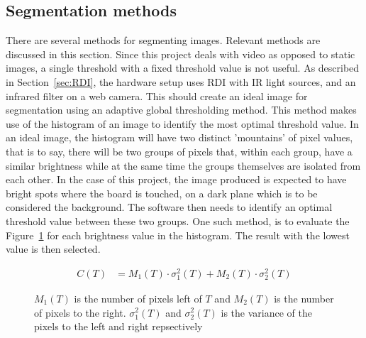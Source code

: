 \subsection{Segmentation methods}
There are several methods for segmenting images. Relevant methods are discussed in this section. Since this project deals with video as opposed to static images, a single threshold with a fixed threshold value is not useful. As described in Section~\ref{sec:RDI}, the hardware setup uses RDI with IR light sources, and an  infrared filter on a web camera. This should create an ideal image for segmentation using an adaptive global thresholding method. This method makes use of the histogram of an image to identify the most optimal threshold value\citep{Moeslund2012c4}. In an ideal image, the histogram will have two distinct 'mountains' of pixel values, that is to say, there will be two groups of pixels that, within each group, have a similar brightness while at the same time the groups themselves are isolated from each other. In the case of this project, the image produced is expected to have bright spots where the board is touched, on a dark plane which is to be considered the background. The software then needs to identify an optimal threshold value between these two groups. One such method, is to evaluate the Figure~\ref{eq:otsu} for each brightness value in the histogram. The result with the lowest value is then selected.
\begin{figure}[h]
	\begin{align*}
	C(T)&=M_1(T)\cdot\sigma_1^2(T)+M_2(T)\cdot\sigma_2^2(T)
	\end{align*}
	\caption{$M_1(T)$ is the number of pixels left of $T$ and $M_2(T)$ is the number of pixels to the right. $\sigma_1^2(T)$ and $\sigma_2^2(T)$ is the variance of the pixels to the left and right repsectively \label{eq:otsu} \citep[p. 61]{moeslund_introduction_2012_chapter_5}}
\end{figure}

